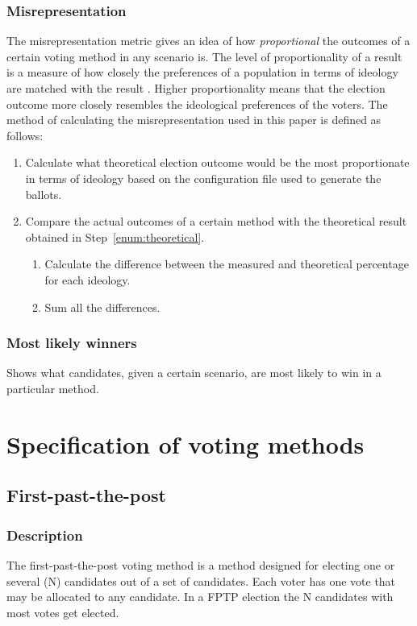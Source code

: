 \documentclass[12pt]{article}
\begin{document}
\subsubsection{Misrepresentation}
The misrepresentation metric gives an idea of how \textit{proportional} the outcomes of a certain voting method in any scenario is. The level of proportionality of a result is a measure of how closely the preferences of a population in terms of ideology are matched with the result \autocite{king200}. Higher proportionality means that the election outcome more closely resembles the ideological preferences of the voters. The method of calculating the misrepresentation used in this paper is defined as follows:
\begin{enumerate}
	\item Calculate what theoretical election outcome would be the most proportionate in terms of ideology based on the configuration file used to generate the ballots.\label{enum:theoretical}
	\item Compare the actual outcomes of a certain method with the theoretical result obtained in Step~\ref{enum:theoretical}.
	\begin{enumerate}
		\item Calculate the difference between the measured and theoretical percentage for each ideology.
		\item Sum all the differences.
	\end{enumerate}
\end{enumerate}
\subsubsection{Most likely winners}
Shows what candidates, given a certain scenario, are most likely to win in a particular method.
\section{Specification of voting methods}
\subsection{First-past-the-post}
\subsubsection{Description}
The first-past-the-post voting method is a method designed for electing one or several (N) candidates out of a set of candidates. Each voter has one vote that may be allocated to any candidate. In a FPTP election the N candidates with most votes get elected. \autocite{wilkinson2017}
\end{document}
